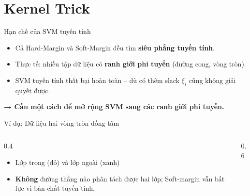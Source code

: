 \section{Kernel Trick}

\begin{frame}{Hạn chế của SVM tuyến tính}
  \begin{itemize}
    \item Cả Hard-Margin và Soft-Margin đều tìm \textbf{siêu phẳng tuyến tính}.
    \item Thực tế: nhiều tập dữ liệu có \textbf{ranh giới phi tuyến} (đường cong, vòng tròn).
    \item SVM tuyến tính thất bại hoàn toàn – dù có thêm slack $\xi_i$ cũng không giải quyết được.
  \end{itemize}
  \vspace{0.3cm}
  \centering
  \textbf{→ Cần một cách để mở rộng SVM sang các ranh giới phi tuyến.}
\end{frame}

\begin{frame}{Ví dụ: Dữ liệu hai vòng tròn đồng tâm}
  \begin{columns}
    \begin{column}{0.4\textwidth}
      \begin{itemize}
        \item Lớp trong (đỏ) và lớp ngoài (xanh)
        \item \textbf{Không} đường thẳng nào phân tách được hai lớp; Soft‑margin vẫn bất lực vì bản chất tuyến tính.
      \end{itemize}
    \end{column}
    \begin{column}{0.6\textwidth}
      \centering
    \end{column}
  \end{columns}
\end{frame}

